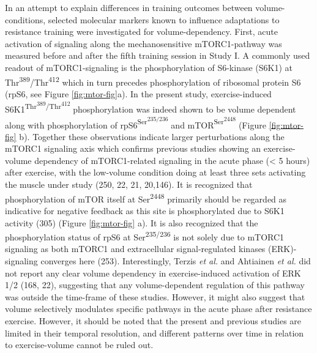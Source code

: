 \documentclass[twoside,10pt]{gihclass} %
\begin{document}
In an attempt to explain differences in training outcomes between volume-conditions, selected molecular markers known to influence adaptations to resistance training were investigated for volume-dependency.
First, acute activation of signaling along the mechanosensitive mTORC1-pathway was measured before and after the fifth training session in Study I.
A commonly used readout of mTORC1-signaling is the phosphorylation of S6-kinase (S6K1) at Thr\textsuperscript{389}/Thr\textsuperscript{412} which in turn precedes phosphorylation of ribosomal protein S6 (rpS6, see Figure \ref{fig:mtor-fig}a).
In the present study, exercise-induced S6K1\textsuperscript{Thr\textsuperscript{389}/Thr\textsuperscript{412}} phosphorylation was indeed shown to be volume dependent along with phosphorylation of rpS6\textsuperscript{Ser\textsuperscript{235/236}} and mTOR\textsuperscript{Ser\textsuperscript{2448}} (Figure \ref{fig:mtor-fig} b).
Together these observations indicate larger perturbations along the mTORC1 signaling axis which confirms previous studies showing an exercise-volume dependency of mTORC1-related signaling in the acute phase (\textless{} 5 hours) after exercise, with the low-volume condition doing at least three sets activating the muscle under study
(250, 22, 21, 20,146).
It is recognized that phosphorylation of mTOR itself at Ser\textsuperscript{2448} primarily should be regarded as indicative for negative feedback as this site is phosphorylated due to S6K1 activity
(305) (Figure \ref{fig:mtor-fig} a).
It is also recognized that the phosphorylation status of rpS6 at Ser\textsuperscript{235/236} is not solely due to mTORC1 signaling as both mTORC1 and extracellular signal-regulated kinases (ERK)-signaling converges here
(253).
Interestingly, Terzis \emph{et al.} and Ahtiainen \emph{et al.} did not report any clear volume dependency in exercise-induced activation of ERK 1/2
(168, 22),
suggesting that any volume-dependent regulation of this pathway was outside the time-frame of these studies. However, it might also suggest that volume selectively modulates specific pathways in the acute phase after resistance exercise.
However, it should be noted that the present and previous studies are limited in their temporal resolution, and different patterns over time in relation to exercise-volume cannot be ruled out.
\end{document}
